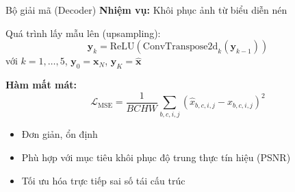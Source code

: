\begin{frame}{Bộ giải mã (Decoder)}
    \textbf{Nhiệm vụ:} Khôi phục ảnh từ biểu diễn nén
    
    \vspace{0.3cm}
    Quá trình lấy mẫu lên (upsampling):
    \begin{equation}
        \mathbf{y}_k = \text{ReLU}(\text{ConvTranspose2d}_k(\mathbf{y}_{k-1}))
    \end{equation}
    với $k=1, \dots, 5$, $\mathbf{y}_0 = \mathbf{x}_N$, $\mathbf{y}_K = \hat{\mathbf{x}}$
    
    \vspace{0.3cm}
    \textbf{Hàm mất mát:}
    \begin{equation}
        \mathcal{L}_{\text{MSE}} = \frac{1}{BCHW} \sum_{b,c,i,j} (\hat{x}_{b,c,i,j} - x_{b,c,i,j})^2
    \end{equation}
    
    \begin{itemize}
        \item Đơn giản, ổn định
        \item Phù hợp với mục tiêu khôi phục độ trung thực tín hiệu (PSNR)
        \item Tối ưu hóa trực tiếp sai số tái cấu trúc
    \end{itemize}
\end{frame}

